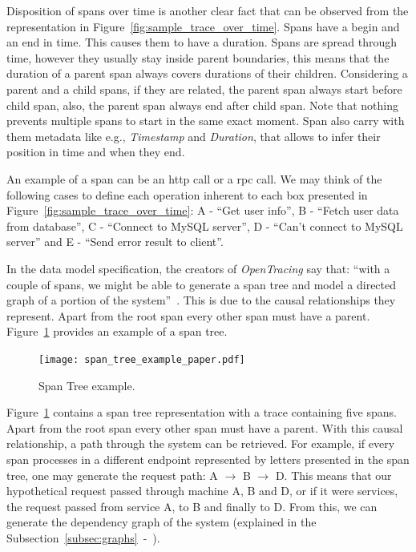 Disposition of spans over time is another clear fact that can be observed from the representation in Figure~\ref{fig:sample_trace_over_time}. Spans have a begin and an end in time. This causes them to have a duration. Spans are spread through time, however they usually stay inside parent boundaries, this means that the duration of a parent span always covers durations of their children. Considering a parent and a child spans, if they are related, the parent span always start before child span, also, the parent span always end after child span. Note that nothing prevents multiple spans to start in the same exact moment. Span also carry with them metadata like e.g., \emph{Timestamp} and \emph{Duration}, that allows to infer their position in time and when they end.

An example of a span can be an \gls{http} call or a \gls{rpc} call. We may think of the following cases to define each operation inherent to each box presented in Figure~\ref{fig:sample_trace_over_time}: A - ``Get user info'', B - ``Fetch user data from database'', C - ``Connect to MySQL server'', D - ``Can't connect to MySQL server'' and E - ``Send error result to client''.

In the data model specification, the creators of \emph{OpenTracing} say that: ``with a couple of spans, we might be able to generate a span tree and model a directed graph of a portion of the system''~\cite{open_tracing_data_model_specification}. This is due to the causal relationships they represent. Apart from the root span every other span must have a parent. Figure~\ref{fig:span_tree_example} provides an example of a span tree.

\begin{figure}[H]
    \centering
    \texttt{[image: span\_tree\_example\_paper.pdf]}
    \caption{Span Tree example.}
    \label{fig:span_tree_example}
\end{figure}

Figure~\ref{fig:span_tree_example} contains a span tree representation with a trace containing five spans. Apart from the root span every other span must have a parent. With this causal relationship, a path through the system can be retrieved. For example, if every span processes in a different endpoint represented by letters presented in the span tree, one may generate the request path: A $\rightarrow$ B $\rightarrow$ D. This means that our hypothetical request passed through machine A, B and D, or if it were services, the request passed from service A, to B and finally to D. From this, we can generate the dependency graph of the system (explained in the Subsection~\ref{subsec:graphs}~-~).

